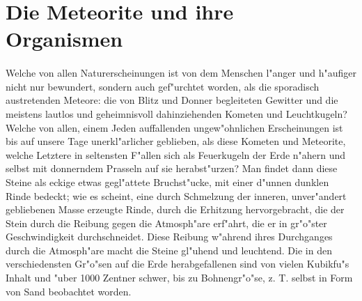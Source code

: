 \documentclass[a4paper, 11pt, oneside]{article}
\begin{document}
\section{Die Meteorite und ihre Organismen}
\paragraph{}
Welche von allen Naturerscheinungen ist von dem Menschen l"anger und h"aufiger nicht nur bewundert, sondern auch gef"urchtet worden, als die sporadisch austretenden Meteore: die von Blitz und Donner begleiteten Gewitter und die meistens lautlos und geheimnisvoll dahinziehenden Kometen und Leuchtkugeln? Welche von allen, einem Jeden auffallenden ungew"ohnlichen Erscheinungen ist bis auf unsere Tage unerkl"arlicher geblieben, als diese Kometen und Meteorite, welche Letztere in seltensten F"allen sich als Feuerkugeln der Erde n"ahern und selbst mit donnerndem Prasseln auf sie herabst"urzen? Man findet dann diese Steine als eckige etwas gegl"attete Bruchst"ucke, mit einer d"unnen dunklen Rinde bedeckt; wie es scheint, eine durch Schmelzung der inneren, unver"andert gebliebenen Masse erzeugte Rinde, durch die Erhitzung hervorgebracht, die der Stein durch die Reibung gegen die Atmosph"are erf"ahrt, die er in gr"o"ster Geschwindigkeit durchschneidet. Diese Reibung w"ahrend ihres Durchganges durch die Atmosph"are macht die Steine gl"uhend und leuchtend. Die in den verschiedensten Gr"o"sen auf die Erde herabgefallenen sind von vielen Kubikfu"s Inhalt und "uber 1000 Zentner schwer, bis zu Bohnengr"o"se, z. T. selbst in Form von Sand beobachtet worden.
\end{document}

